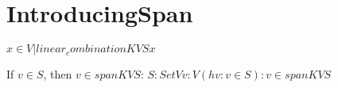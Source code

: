 \section{IntroducingSpan}


\begin{definition}
  \label{definition : span}
  \leanok
  ${ x \in V | linear_combination K V S x }$
\end{definition}

\begin{theorem}
  \label{theorem : mem_span_of_mem}
  \leanok
  If $v \in S$, then $v \in span K V S$: ${S : Set V} {v : V} (hv : v \in S) : v \in span K V S$
\end{theorem}
